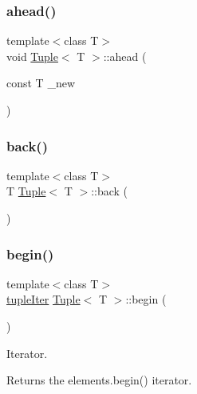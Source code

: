 \subsubsection{\texorpdfstring{ahead()}{ahead()}}
{\footnotesize\ttfamily template$<$class T$>$ \\
void \mbox{\hyperlink{class_tuple}{Tuple}}$<$ T $>$\+::ahead (\begin{DoxyParamCaption}\item[{const T}]{\+\_\+new }\end{DoxyParamCaption})\hspace{0.3cm}{\ttfamily [inline]}}

\mbox{\label{class_tuple_ad885e206e13107c8f4c6005216f5da29}} 
\subsubsection{\texorpdfstring{back()}{back()}}
{\footnotesize\ttfamily template$<$class T$>$ \\
T \mbox{\hyperlink{class_tuple}{Tuple}}$<$ T $>$\+::back (\begin{DoxyParamCaption}{ }\end{DoxyParamCaption})\hspace{0.3cm}{\ttfamily [inline]}}

\mbox{\label{class_tuple_a205dfb3c3dcad03ced830b5c9687d225}} 
\subsubsection{\texorpdfstring{begin()}{begin()}\hspace{0.1cm}{\footnotesize\ttfamily [1/2]}}
{\footnotesize\ttfamily template$<$class T$>$ \\
\mbox{\hyperlink{maths_8hh_ad22dcdeefda7d41523cc1604953eb6cc}{tuple\+Iter}} \mbox{\hyperlink{class_tuple}{Tuple}}$<$ T $>$\+::begin (\begin{DoxyParamCaption}{ }\end{DoxyParamCaption})\hspace{0.3cm}{\ttfamily [inline]}}



Iterator. 

\begin{DoxyReturn}{Returns}
the elements.\+begin() iterator. 
\end{DoxyReturn}
\mbox{\label{class_tuple_ab5d618dac69995db6adb0e657cd73bb3}} 
